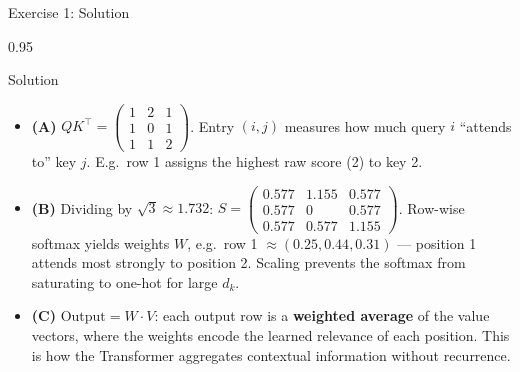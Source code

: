 \documentclass[9pt, aspectratio=169, t]{beamer}
\begin{document}
\begin{frame}{Exercise 1: Solution}
    \begin{cminipage}{0.95\textwidth}
    \begin{exampleblock}{Solution}
        {\footnotesize
        \begin{itemize}\setlength{\itemsep}{3pt}
            \item \textcolor{MainBlue}{\textbf{(A)}}
                $QK^\top = \begin{pmatrix} 1 & 2 & 1 \\ 1 & 0 & 1 \\ 1 & 1 & 2 \end{pmatrix}$.
                Entry $(i,j)$ measures how much query $i$ ``attends to'' key $j$. E.g.\ row 1 assigns the highest raw score (2) to key 2.
            \item \textcolor{MainBlue}{\textbf{(B)}} Dividing by $\sqrt{3} \approx 1.732$:
                $S = \begin{pmatrix} 0.577 & 1.155 & 0.577 \\ 0.577 & 0 & 0.577 \\ 0.577 & 0.577 & 1.155 \end{pmatrix}$.
                Row-wise softmax yields weights $W$, e.g.\ row 1 $\approx (0.25, 0.44, 0.31)$ --- position 1 attends most strongly to position 2. Scaling prevents the softmax from saturating to one-hot for large $d_k$.
            \item \textcolor{MainBlue}{\textbf{(C)}} $\text{Output} = W \cdot V$: each output row is a \textbf{weighted average} of the value vectors, where the weights encode the learned relevance of each position. This is how the Transformer aggregates contextual information without recurrence.
        \end{itemize}
        }
    \end{exampleblock}
    \end{cminipage}
\end{frame}
\end{document}
